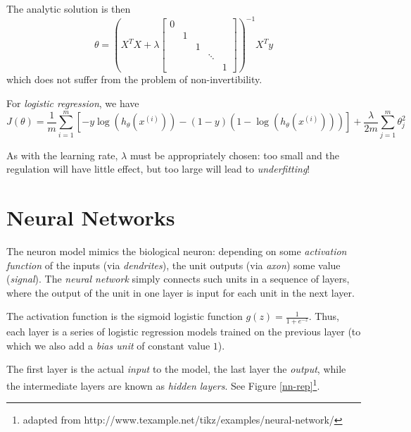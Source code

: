 \documentclass[a4paper,12pt]{article}
\theoremstyle{definition}
\begin{document}
The analytic solution is then
\[
\theta = \left( X^T X + \lambda 
\begin{bmatrix}
0 &  &  &  & \\ 
 & 1 &  &  & \\ 
 &  & 1 &  & \\ 
 &  &  & \ddots & \\ 
 &  &  &  & 1
\end{bmatrix}
\right)^{-1} X^T y
\]
which does not suffer from the problem of non-invertibility.

For \emph{logistic regression}, we have
\[
J(\theta) = \frac{1}{m} \sum_{i=1}^{m} \left[ - y \log(h_{\theta}(x^{(i)})) - (1 - y)(1 - \log(h_{\theta}(x^{(i)}))) \right] + \frac{\lambda}{2m} \sum_{j=1}^{m} \theta_j^2
\]

As with the learning rate, $\lambda$ must be appropriately chosen: too small and the regulation will have little effect, but too large will lead to \emph{underfitting}!

\section{Neural Networks}

The neuron model mimics the biological neuron: depending on some \emph{activation function} of the inputs (via \emph{dendrites}), the unit outputs (via \emph{axon}) some value (\emph{signal}). The \emph{neural network} simply connects such units in a sequence of layers, where the output of the unit in one layer is input for each unit in the next layer. 

The activation function is the sigmoid logistic function $g(z) = \frac{1}{1 + e^{-z}}$. Thus, each layer is a series of logistic regression models trained on the previous layer (to which we also add a \emph{bias unit} of constant value $1$).

The first layer is the actual \emph{input} to the model, the last layer the \emph{output}, while the intermediate layers are known as \emph{hidden layers}. See Figure \ref{nn-rep}\footnote{adapted from http://www.texample.net/tikz/examples/neural-network/}.
\end{document}
